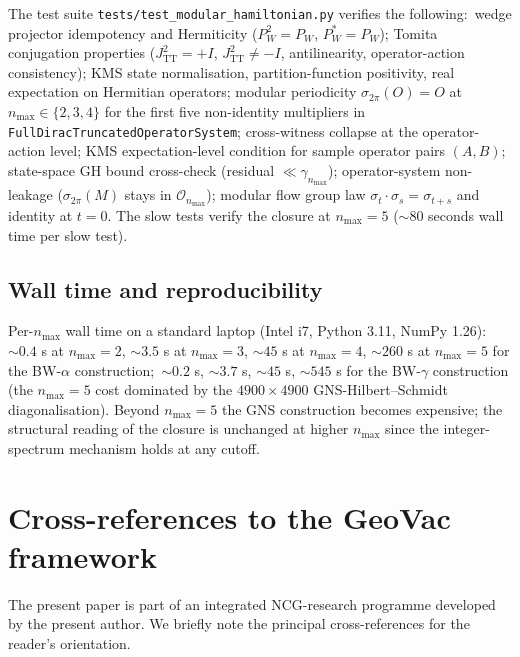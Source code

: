 \documentclass[11pt,a4paper]{article}
\theoremstyle{plain}
\theoremstyle{definition}
\newcommand{\nmax}{n_{\max}}
\newcommand{\Op}{\mathcal{O}}
\newcommand{\TT}{\mathrm{TT}}
\begin{document}
The test suite \verb|tests/test_modular_hamiltonian.py| verifies the
following:\ wedge projector idempotency and Hermiticity ($P_W^2 =
P_W$, $P_W^* = P_W$); Tomita conjugation properties ($J_{\TT}^2 = +I$,
$J_{\TT}^2 \ne -I$, antilinearity, operator-action consistency); KMS
state normalisation, partition-function positivity, real expectation
on Hermitian operators; modular periodicity $\sigma_{2\pi}(O) = O$ at
$\nmax \in \{2, 3, 4\}$ for the first five non-identity multipliers in
\verb|FullDiracTruncatedOperatorSystem|; cross-witness collapse at
the operator-action level; KMS expectation-level condition for sample
operator pairs $(A, B)$; state-space GH bound cross-check
(residual $\ll \gamma_{\nmax}$); operator-system non-leakage
($\sigma_{2\pi}(M)$ stays in $\Op_{\nmax}$); modular flow group law
$\sigma_t \cdot \sigma_s = \sigma_{t+s}$ and identity at $t = 0$. The
slow tests verify the closure at $\nmax = 5$ ($\sim$80 seconds wall
time per slow test).

\subsection{Wall time and reproducibility}\label{sec:wall_time}

Per-$\nmax$ wall time on a standard laptop (Intel i7, Python 3.11,
NumPy 1.26):\ $\sim 0.4$ s at $\nmax = 2$, $\sim 3.5$ s at $\nmax = 3$,
$\sim 45$ s at $\nmax = 4$, $\sim 260$ s at $\nmax = 5$ for the
BW-$\alpha$ construction;\ $\sim 0.2$ s, $\sim 3.7$ s, $\sim 45$ s,
$\sim 545$ s for the BW-$\gamma$ construction (the $\nmax = 5$ cost
dominated by the $4900 \times 4900$ GNS-Hilbert--Schmidt
diagonalisation). Beyond $\nmax = 5$ the GNS construction becomes
expensive; the structural reading of the closure is unchanged at
higher $\nmax$ since the integer-spectrum mechanism holds at any
cutoff.

\section{Cross-references to the GeoVac framework}
\label{app:framework_crossref}

The present paper is part of an integrated NCG-research programme
developed by the present author. We briefly note the principal
cross-references for the reader's orientation.
\end{document}
